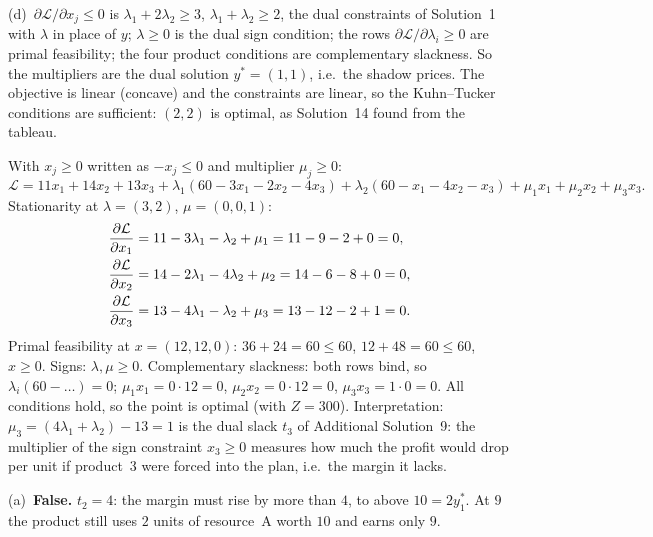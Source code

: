 \begin{solutions}
        (d)~$\partial\mathcal{L}/\partial x_{j}\le 0$ is
        $\lambda_{1}+2\lambda_{2}\ge 3$, $\lambda_{1}+\lambda_{2}\ge 2$,
        the dual constraints of Solution~1 with $\lambda$ in place of $y$;
        $\lambda\ge 0$ is the dual sign condition; the rows
        $\partial\mathcal{L}/\partial\lambda_{i}\ge 0$ are primal
        feasibility; the four product conditions are complementary
        slackness. So the multipliers are the dual solution
        $y^{*}=(1,1)$, i.e.\ the shadow prices. The objective is linear
        (concave) and the constraints are linear, so the Kuhn--Tucker
        conditions are sufficient: $(2,2)$ is optimal, as Solution~14
        found from the tableau.

  \item With $x_{j}\ge 0$ written as $-x_{j}\le 0$ and multiplier
        $\mu_{j}\ge 0$:
        \[
          \mathcal{L}=11x_{1}+14x_{2}+13x_{3}
          +\lambda_{1}(60-3x_{1}-2x_{2}-4x_{3})
          +\lambda_{2}(60-x_{1}-4x_{2}-x_{3})
          +\mu_{1}x_{1}+\mu_{2}x_{2}+\mu_{3}x_{3} .
        \]
        Stationarity at $\lambda=(3,2)$, $\mu=(0,0,1)$:
        \[
          \begin{aligned}
            \frac{\partial \mathcal{L}}{\partial x_{1}}&=11-3\lambda_{1}-\lambda_{2}+\mu_{1}
              =11-9-2+0=0,\\
            \frac{\partial \mathcal{L}}{\partial x_{2}}&=14-2\lambda_{1}-4\lambda_{2}+\mu_{2}
              =14-6-8+0=0,\\
            \frac{\partial \mathcal{L}}{\partial x_{3}}&=13-4\lambda_{1}-\lambda_{2}+\mu_{3}
              =13-12-2+1=0 .
          \end{aligned}
        \]
        Primal feasibility at $x=(12,12,0)$: $36+24=60\le 60$,
        $12+48=60\le 60$, $x\ge 0$. Signs: $\lambda,\mu\ge 0$.
        Complementary slackness: both rows bind, so
        $\lambda_{i}(60-\dots)=0$; $\mu_{1}x_{1}=0\cdot12=0$,
        $\mu_{2}x_{2}=0\cdot12=0$, $\mu_{3}x_{3}=1\cdot0=0$. All conditions
        hold, so the point is optimal (with $Z=300$). Interpretation:
        $\mu_{3}=(4\lambda_{1}+\lambda_{2})-13=1$ is the dual slack $t_{3}$
        of Additional Solution~9: the multiplier of the sign constraint
        $x_{3}\ge 0$ measures how much the profit would drop per unit if
        product~3 were forced into the plan, i.e.\ the margin it lacks.

  \item (a)~\textbf{False.} $t_{2}=4$: the margin must rise by more than
        $4$, to above $10=2y_{1}^{*}$. At $9$ the product still uses
        $2$ units of resource~A worth $10$ and earns only $9$.


\end{solutions}
